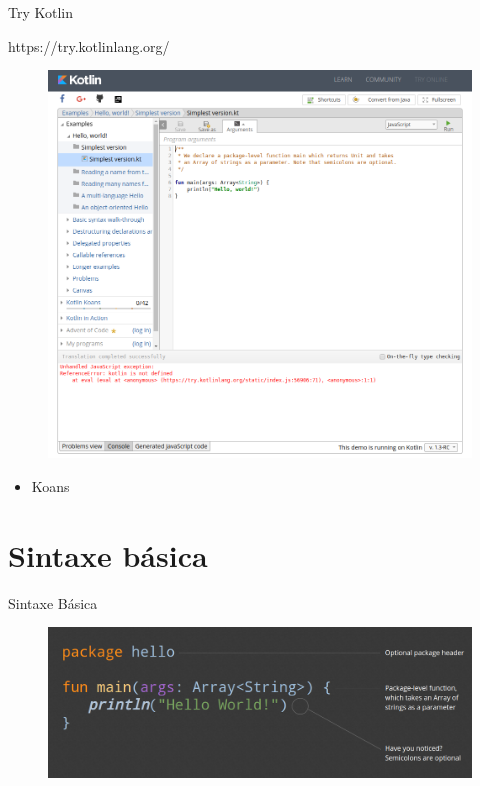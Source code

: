 \documentclass{beamer}
\begin{document}
\begin{frame}{Try Kotlin}

	https://try.kotlinlang.org/
	
	\begin{figure}[!htb]
		\centering
		\includegraphics[scale=.20]{trykotlin.png}
	\end{figure}
	
	\begin{itemize}
		\item Koans
	\end{itemize}
	
\end{frame}





\section{Sintaxe básica}
	\begin{frame}{Sintaxe Básica}
		\begin{figure}[!htb]
			\centering
			\includegraphics[scale=.23]{helloworld.png}
		\end{figure}
	\end{frame}
\end{document}
